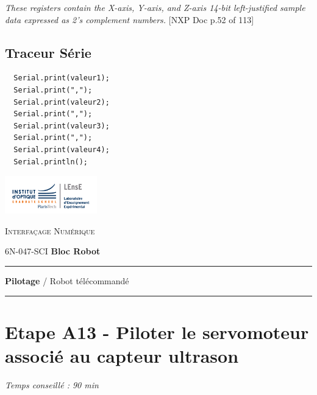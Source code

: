 \documentclass[a4paper,11pt,titlepage]{article} %
\begin{document}
\textit{These registers contain the X-axis, Y-axis, and Z-axis 14-bit left-justified sample data expressed as 2's complement numbers.} [NXP Doc p.52 of 113] 

\subsection{Traceur Série}

\begin{lstlisting}
  Serial.print(valeur1);
  Serial.print(",");
  Serial.print(valeur2);
  Serial.print(",");
  Serial.print(valeur3);
  Serial.print(",");
  Serial.print(valeur4);
  Serial.println();
\end{lstlisting}


\newpage
\strut %
\begin{minipage}[c]{.25\linewidth}
	\includegraphics[width=4cm]{images/Logo-LEnsE.png}
\end{minipage} \hfill
\begin{minipage}[c]{.4\linewidth}

\begin{center}
\vspace{0.3cm}
{\Large \textsc{Interfaçage Numérique}}

\medskip

6N-047-SCI \qquad \textbf{\Large Bloc Robot}

\end{center}
\end{minipage}\hfill

\vspace{0.5cm}

\noindent \rule{\linewidth}{1pt}

{\noindent\Large \rule[-7pt]{0pt}{30pt} \textbf{Pilotage} / Robot télécommandé} 

\noindent \rule{\linewidth}{1pt}


\section{Etape A13 - Piloter le servomoteur associé au capteur ultrason}

\textit{Temps conseillé : 90 min}
\end{document}

